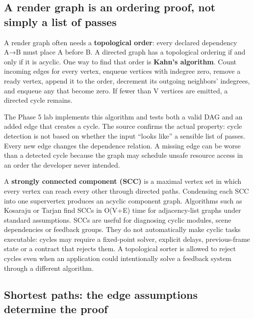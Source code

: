 \subsection{A render graph is an ordering proof, not simply a list of passes}\label{01-foundations-i-ch008-a-render-graph-is-an-ordering-proof-not-simply-a-list-of-passes}

\hypertarget{01-foundations-i-ch008-a-render-graph-is-an-ordering-proof-not-simply-a-list-of-passes}{}

A render graph often needs a \textbf{topological order}: every declared dependency A→B must place A before B. A directed graph has a topological ordering if and only if it is acyclic. One way to find that order is \textbf{Kahn's algorithm}. Count incoming edges for every vertex, enqueue vertices with indegree zero, remove a ready vertex, append it to the order, decrement its outgoing neighbors' indegrees, and enqueue any that become zero. If fewer than V vertices are emitted, a directed cycle remains.

The Phase 5 lab implements this algorithm and tests both a valid DAG and an added edge that creates a cycle. The source confirms the actual property: cycle detection is not based on whether the input ``looks like'' a sensible list of passes. Every new edge changes the dependence relation. A missing edge can be worse than a detected cycle because the graph may schedule unsafe resource access in an order the developer never intended.

A \textbf{strongly connected component (SCC)} is a maximal vertex set in which every vertex can reach every other through directed paths. Condensing each SCC into one supervertex produces an acyclic component graph. Algorithms such as Kosaraju or Tarjan find SCCs in O(V+E) time for adjacency-list graphs under standard assumptions. SCCs are useful for diagnosing cyclic modules, scene dependencies or feedback groups. They do not automatically make cyclic tasks executable: cycles may require a fixed-point solver, explicit delays, previous-frame state or a contract that rejects them. A topological sorter is allowed to reject cycles even when an application could intentionally solve a feedback system through a different algorithm.

\subsection{Shortest paths: the edge assumptions determine the proof}\label{01-foundations-i-ch008-shortest-paths-the-edge-assumptions-determine-the-proof}

